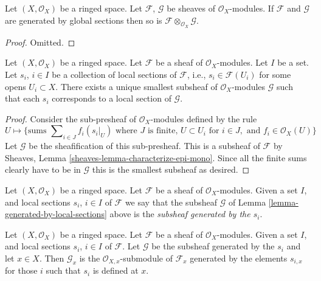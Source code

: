 \begin{lemma}
\label{lemma-tensor-product-globally-generated}
Let $(X, \mathcal{O}_X)$ be a ringed space.
Let $\mathcal{F}$, $\mathcal{G}$ be sheaves of $\mathcal{O}_X$-modules.
If $\mathcal{F}$ and $\mathcal{G}$ are generated by global sections
then so is $\mathcal{F} \otimes_{\mathcal{O}_X} \mathcal{G}$.
\end{lemma}

\begin{proof}
Omitted.
\end{proof}

\begin{lemma}
\label{lemma-generated-by-local-sections}
Let $(X, \mathcal{O}_X)$ be a ringed space.
Let $\mathcal{F}$ be a sheaf of $\mathcal{O}_X$-modules.
Let $I$ be a set. Let $s_i$, $i \in I$ be a collection
of local sections of $\mathcal{F}$, i.e., $s_i \in \mathcal{F}(U_i)$
for some opens $U_i \subset X$. There exists a unique smallest
subsheaf of $\mathcal{O}_X$-modules $\mathcal{G}$ such
that each $s_i$ corresponds to a local section of
$\mathcal{G}$.
\end{lemma}

\begin{proof}
Consider the sub-presheaf of $\mathcal{O}_X$-modules
defined by the rule
$$
U
\longmapsto
\{
\text{sums } \sum\nolimits_{i \in J} f_i (s_i|_U)
\text{ where } J \text{ is finite, }
U \subset U_i \text{ for } i\in J, \text{ and }
f_i \in \mathcal{O}_X(U)
\}
$$
Let $\mathcal{G}$ be the sheafification of this sub-presheaf.
This is a subsheaf of $\mathcal{F}$ by
Sheaves, Lemma \ref{sheaves-lemma-characterize-epi-mono}.
Since all the finite sums clearly have to be in $\mathcal{G}$
this is the smallest subsheaf as desired.
\end{proof}

\begin{definition}
\label{definition-generated-by-local-sections}
Let $(X, \mathcal{O}_X)$ be a ringed space.
Let $\mathcal{F}$ be a sheaf of $\mathcal{O}_X$-modules.
Given a set $I$, and
local sections $s_i$, $i \in I$ of $\mathcal{F}$
we say that the subsheaf $\mathcal{G}$ of
Lemma \ref{lemma-generated-by-local-sections}
above is the {\it subsheaf generated by the $s_i$}.
\end{definition}

\begin{lemma}
\label{lemma-generated-by-local-sections-stalk}
Let $(X, \mathcal{O}_X)$ be a ringed space.
Let $\mathcal{F}$ be a sheaf of $\mathcal{O}_X$-modules.
Given a set $I$, and
local sections $s_i$, $i \in I$ of $\mathcal{F}$.
Let $\mathcal{G}$ be the subsheaf generated by the
$s_i$ and let $x\in X$.
Then $\mathcal{G}_x$ is the $\mathcal{O}_{X, x}$-submodule of
$\mathcal{F}_x$ generated by the elements $s_{i, x}$
for those $i$ such that $s_i$ is defined at $x$.
\end{lemma}

